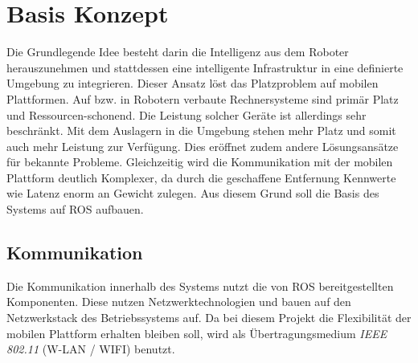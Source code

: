 \chapter{Basis Konzept}
Die Grundlegende Idee besteht darin die Intelligenz aus dem Roboter herauszunehmen und stattdessen eine intelligente Infrastruktur in eine definierte Umgebung zu integrieren. Dieser Ansatz löst das Platzproblem auf mobilen Plattformen. Auf bzw. in Robotern verbaute Rechnersysteme sind primär Platz und Ressourcen-schonend. Die Leistung solcher Geräte ist allerdings sehr beschränkt. Mit dem Auslagern in die Umgebung stehen mehr Platz und somit auch mehr Leistung zur Verfügung. Dies eröffnet zudem andere Lösungsansätze für bekannte Probleme. Gleichzeitig wird die Kommunikation mit der mobilen Plattform deutlich Komplexer, da durch die geschaffene Entfernung Kennwerte wie Latenz enorm an Gewicht zulegen. Aus diesem Grund soll die Basis des Systems auf ROS aufbauen. 

	\section{Kommunikation}
	Die Kommunikation innerhalb des Systems nutzt die von ROS bereitgestellten Komponenten. Diese nutzen Netzwerktechnologien und bauen auf den Netzwerkstack des Betriebssystems auf. Da bei diesem Projekt die Flexibilität der mobilen Plattform erhalten bleiben soll, wird als Übertragungsmedium \textit{IEEE 802.11} (W-LAN / WIFI) benutzt.

